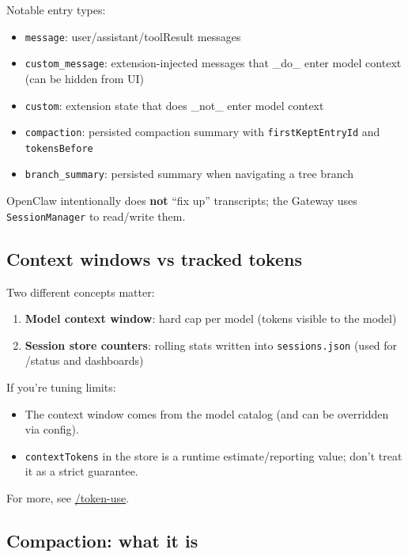 Notable entry types:

\begin{itemize}
  \item \texttt{message}: user/assistant/toolResult messages
  \item \texttt{custom\_message}: extension-injected messages that \_do\_ enter model context (can be hidden from UI)
  \item \texttt{custom}: extension state that does \_not\_ enter model context
  \item \texttt{compaction}: persisted compaction summary with \texttt{firstKeptEntryId} and \texttt{tokensBefore}
  \item \texttt{branch\_summary}: persisted summary when navigating a tree branch
\end{itemize}


OpenClaw intentionally does \textbf{not} “fix up” transcripts; the Gateway uses \texttt{SessionManager} to read/write them.

\hrulefill


\subsection{Context windows vs tracked tokens}


Two different concepts matter:

\begin{enumerate}
  \item \textbf{Model context window}: hard cap per model (tokens visible to the model)
  \item \textbf{Session store counters}: rolling stats written into \texttt{sessions.json} (used for /status and dashboards)
\end{enumerate}


If you’re tuning limits:

\begin{itemize}
  \item The context window comes from the model catalog (and can be overridden via config).
  \item \texttt{contextTokens} in the store is a runtime estimate/reporting value; don’t treat it as a strict guarantee.
\end{itemize}


For more, see \href{/reference/token-use}{/token-use}.

\hrulefill


\subsection{Compaction: what it is}


